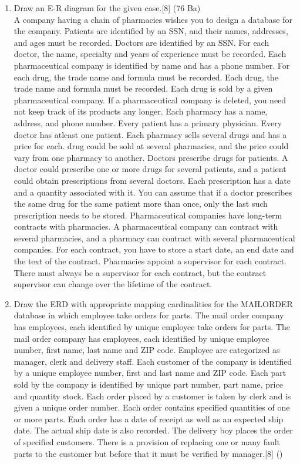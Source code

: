 \documentclass[12pt]{article}
\begin{document}
\begin{enumerate}
    \item Draw an E-R diagram for the given case.\hfill[8] (76 Ba)\\
    A company having a chain of pharmacies wishes you to design a database for the company. Patients are identified by an SSN, and their names, addresses, and ages must be recorded. Doctors are identified by an SSN. For each doctor, the name, specialty and years of experience must be recorded. Each pharmaceutical company is identified by name and has a phone number. For each drug, the trade name and formula must be recorded. Each drug, the trade name and formula must be recorded. Each drug is sold by a given pharmaceutical company. If a pharmaceutical company is deleted, you need not keep track of its products any longer. Each pharmacy has a name, address, and phone number. Every patient has a primary physician. Every doctor has atleast one patient. Each pharmacy sells several drugs and has a price for each.  drug could be sold at several pharmacies, and the price could vary from one pharmacy to another. Doctors prescribe drugs for patients. A doctor could prescribe one or more drugs for several patients, and a patient could obtain prescriptions from several doctors. Each prescription has a date and a quantity associated with it. You can assume that if a doctor prescribes the same drug for the same patient more than once, only the last such prescription needs to be stored. Pharmaceutical companies have long-term contracts with pharmacies. A pharmaceutical company can contract with several pharmacies, and a pharmacy can contract with several pharmaceutical companies. For each contract, you have to store a start date, an end date and the text of the contract. Pharmacies appoint a supervisor for each contract. There must always be a supervisor for each contract, but the contract supervisor can change over the lifetime of the contract.

    \item Draw the ERD with appropriate mapping cardinalities for the MAIL\textunderscore ORDER database in which employee take orders for parts. The mail order company has employees, each identified by unique employee take orders for parts. The mail order company has employees, each identified by unique employee number, first name, last name and ZIP code. Employee are categorized as manager, clerk and delivery staff. Each customer of the company is identified by a unique employee number, first and last name and ZIP code. Each part sold by the company is identified by unique part number, part name, price and quantity stock. Each order placed by a customer is taken by clerk and is given a unique order number. Each order contains specified quantities of one or more parts. Each order has a date of receipt as well as an expected ship date. The actual ship date is also recorded. The delivery boy places the order of specified customers. There is a provision of replacing one or many fault parts to the customer but before that it must be verified by manager.\hfill[8] ()


\end{enumerate}
\end{document}
